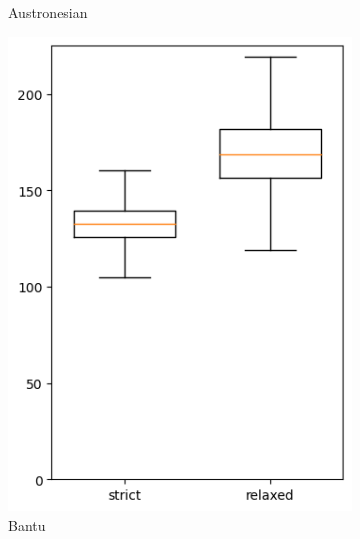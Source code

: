 \documentclass[]{rsos}%
\begin{document}
\begin{figure}
\begin{subfigure}{0.4\textwidth}
    \caption{Austronesian}
  \end{subfigure}
  \begin{subfigure}{0.4\textwidth}
    \includegraphics[width=\textwidth]{supplement/analysis/bantu_years_per_split.png}
    \caption{Bantu}
  \end{subfigure}
  \begin{subfigure}{0.4\textwidth}

\end{subfigure}
\end{figure}
\end{document}
